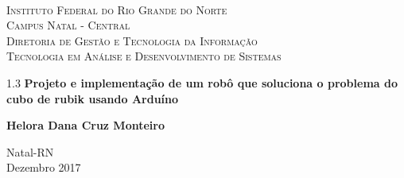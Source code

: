 
\begin{titlepage}
	\begin{center}
		
		  
		\begin{minipage}{11.15cm}
			\begin{center}
				\begin{espacosimples}
					{\small \ \\
                       \textsc{Instituto Federal do Rio Grande do Norte}
                       \\
							  \textsc{Campus Natal - Central}					\\
							  \textsc{Diretoria de Gestão e Tecnologia da Informação}	   
							  \\
							  \textsc{Tecnologia em Análise e Desenvolvimento de Sistemas}}   	
                       \\
				\end{espacosimples}
			\end{center}
		\end{minipage}

			
		\vspace{6cm}
						
		{\setlength{\baselineskip}%
		{1.3\baselineskip}
		{\LARGE \textbf{Projeto e implementação de um robô que soluciona o problema do cubo de rubik usando Arduíno}}\par}
			
		\vspace{3cm}
			
		{\large \textbf{Helora Dana Cruz Monteiro}}
						
		\vspace{6cm}
		
		Natal-RN\\Dezembro 2017
	\end{center}
\end{titlepage}